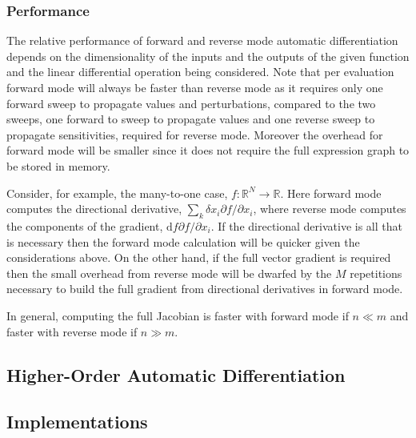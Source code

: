 \subsubsection{Performance}

The relative performance of forward and reverse mode automatic differentiation
depends on the dimensionality of the inputs and the outputs of the given function
and the linear differential operation being considered.  Note that per evaluation forward 
mode will always be faster than reverse mode as it requires only one forward sweep 
to propagate values and perturbations, compared to the two sweeps, one forward to 
sweep to propagate values and one reverse sweep to propagate sensitivities, required 
for reverse mode.  Moreover the overhead for forward mode will be smaller since it 
does not require the full expression graph to be stored in memory.

Consider, for example, the many-to-one case, $f : \mathbb{R}^{N} \rightarrow \mathbb{R}$.  
Here forward mode computes the directional derivative, $\sum_{k} \delta x_{i} \partial f / \partial x_{i}$,
where reverse mode computes the components of the gradient, $\mathrm{d} f \partial f / \partial x_{i}$.  
If the directional derivative is all that is necessary then the forward mode calculation 
will be quicker given the considerations above.  On the other hand, if the full vector gradient 
is required then the small overhead from reverse mode will be dwarfed by the $M$ repetitions 
necessary to build the full gradient from directional derivatives in forward mode.

In general, computing the full Jacobian is faster with forward mode if $n \ll m$ 
and faster with reverse mode if $n \gg m$.

\subsection{Higher-Order Automatic Differentiation}

\subsection{Implementations}
